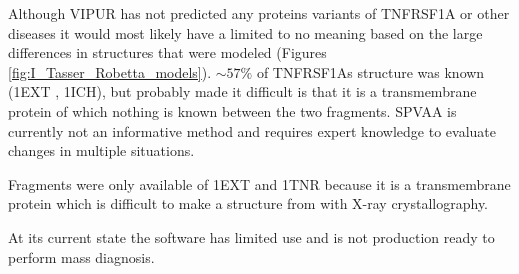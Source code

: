 %
%
 
Although VIPUR has not predicted any proteins variants of TNFRSF1A or other diseases it would most likely have a limited to no meaning based on the large differences in structures that were modeled (Figures \ref{fig:I_Tasser_Robetta_models}). $\sim57\%$ of TNFRSF1As structure was known (1EXT\cite{} , 1ICH\cite{}), but probably made it difficult is that it is a transmembrane protein of which nothing is known between the two fragments.
SPVAA is currently not an informative method and requires expert knowledge to evaluate changes in multiple situations.

Fragments were only available of 1EXT and 1TNR because it is a transmembrane protein which is difficult to make a structure from with X-ray crystallography.

At its current state the software has limited use and is not production ready to perform mass diagnosis.

%
